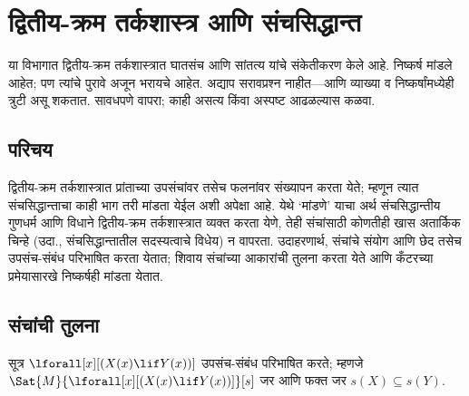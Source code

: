 \chapter{द्वितीय-क्रम तर्कशास्त्र आणि संचसिद्धान्त}\label{sol:set:chap}
\begin{editorial}
या विभागात द्वितीय-क्रम तर्कशास्त्रात घातसंच आणि
सांतत्य यांचे संकेतीकरण केले आहे. निष्कर्ष मांडले
आहेत; पण त्यांचे पुरावे अजून भरायचे आहेत. अद्याप
सरावप्रश्न नाहीत---आणि व्याख्या व निष्कर्षांमध्येही
त्रुटी असू शकतात. सावधपणे वापरा; काही असत्य
किंवा अस्पष्ट आढळल्यास कळवा.
\end{editorial}









\section{परिचय}\label{sol:set:int:sec}

द्वितीय-क्रम तर्कशास्त्रात प्रांताच्या उपसंचांवर तसेच
फलनांवर संख्यापन करता येते; म्हणून त्यात संचसिद्धान्ताचा
काही भाग तरी मांडता येईल अशी अपेक्षा आहे. येथे
‘मांडणे’ याचा अर्थ संचसिद्धान्तीय गुणधर्म आणि विधाने
द्वितीय-क्रम तर्कशास्त्रात व्यक्त करता येणे, तेही
संचांसाठी कोणतीही खास अतार्किक चिन्हे (उदा.,
संचसिद्धान्तातील सदस्यत्वाचे विधेय) न वापरता.
उदाहरणार्थ, संचांचे संयोग आणि छेद तसेच उपसंच-संबंध
परिभाषित करता येतात; शिवाय संचांच्या आकारांची तुलना
करता येते आणि कँटरच्या प्रमेयासारखे निष्कर्षही मांडता येतात.












\section{संचांची तुलना}\label{sol:set:cmp:sec}

\begin{prop}
सूत्र $\lforall[x][(X(x) \lif Y(x))]$ उपसंच-संबंध
परिभाषित करते; म्हणजे
$\Sat{M}{\lforall[x][(X(x) \lif Y(x))]}[s]$
जर आणि फक्त जर $s(X) \subseteq s(Y)$.
\end{prop}

